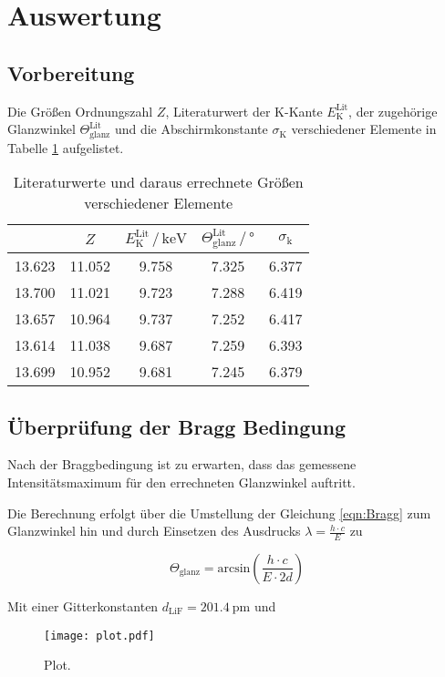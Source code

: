\section{Auswertung}
\label{sec:Auswertung}

\subsection{Vorbereitung}

Die Größen Ordnungszahl $Z$, Literaturwert der
K-Kante $E_\text{K}^\text{Lit}$, der zugehörige Glanzwinkel 
$\Theta_\text{glanz}^\text{Lit}$ und die Abschirmkonstante 
$\sigma_\text{K}$ verschiedener Elemente in Tabelle 
\ref{tab:literatur} aufgelistet.

\begin{table}
  \centering
  \caption{Literaturwerte und daraus errechnete Größen verschiedener Elemente}
  \label{tab:literatur}
  \begin{tabular}{c c c c c}
  \toprule
  $ $ & $Z$ & $E_\text{K}^\text{Lit} \,/\, \si{\kilo\eV}$
  & $\Theta_\text{glanz}^\text{Lit} \,/\, \si{\degree}$ & 
  $\sigma_\text{k}$\\
  \midrule 
  13.623 & 11.052 & 9.758 & 7.325 & 6.377 &  \\
  13.700 & 11.021 & 9.723 & 7.288 & 6.419 &  \\
  13.657 & 10.964 & 9.737 & 7.252 & 6.417 &  \\
  13.614 & 11.038 & 9.687 & 7.259 & 6.393 &  \\
  13.699 & 10.952 & 9.681 & 7.245 & 6.379 &  \\
  \bottomrule
  \end{tabular}
  \end{table}




\subsection{Überprüfung der Bragg Bedingung}

Nach der Braggbedingung ist zu erwarten, dass das gemessene Intensitätsmaximum
für den errechneten Glanzwinkel auftritt. 

Die Berechnung erfolgt über die Umstellung der Gleichung \eqref{eqn:Bragg} zum Glanzwinkel
hin und durch Einsetzen des Ausdrucks $\lambda = \frac{h \cdot c}{E}$ zu 

\begin{equation}
  \Theta_\text{glanz} = \text{arcsin}\left(\frac{h \cdot c}{E \cdot 2d}\right)
\end{equation}

Mit einer Gitterkonstanten $d_\text{LiF} = \SI{201.4}{\pico\meter}$ und 




\begin{figure}
  \centering
  \texttt{[image: plot.pdf]}
  \caption{Plot.}
  \label{fig:plot}
\end{figure}
